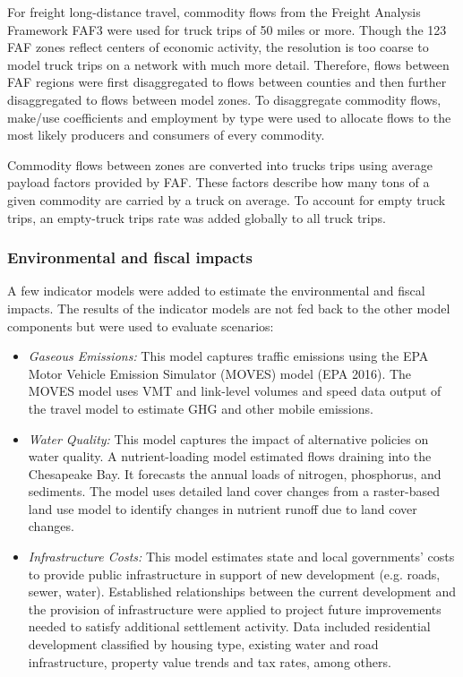 For freight long-distance travel, commodity flows from the Freight Analysis Framework FAF3 were used for truck trips of 50 miles or more. Though the 123 FAF zones reflect centers of economic activity, the resolution is too coarse to model truck trips on a network with much more detail. Therefore, flows between FAF regions were first disaggregated to flows between counties and then further disaggregated to flows between model zones. To disaggregate commodity flows, make/use coefficients and employment by type were used to allocate flows to the most likely producers and consumers of every commodity.

Commodity flows between zones are converted into trucks trips using average payload factors provided by FAF. These factors describe how many tons of a given commodity are carried by a truck on average. To account for empty truck trips, an empty-truck trips rate was added globally to all truck trips.

\subsubsection{Environmental and fiscal impacts}

A few indicator models were added to estimate the environmental and fiscal impacts. The results of the indicator models are not fed back to the other model components but were used to evaluate scenarios:
\begin{itemize}
\item
\emph{Gaseous Emissions:} This model captures traffic emissions using the EPA Motor Vehicle Emission Simulator (MOVES) model (EPA 2016). The MOVES model uses VMT and link-level volumes and speed data output of the travel model to estimate GHG and other mobile emissions.
\item
\emph{Water Quality:} This model captures the impact of alternative policies on water quality. A nutrient-loading model estimated flows draining into the Chesapeake Bay. It forecasts the annual loads of nitrogen, phosphorus, and sediments. The model uses detailed land cover changes from a raster-based land use model to identify changes in nutrient runoff due to land cover changes.
\item
\emph{Infrastructure Costs:} This model estimates state and local governments' costs to provide public infrastructure in support of new development (e.g. roads, sewer, water). Established relationships between the current development and the provision of infrastructure were applied to project future improvements needed to satisfy additional settlement activity. Data included residential development classified by housing type, existing water and road infrastructure, property value trends and tax rates, among others.
\end{itemize}

